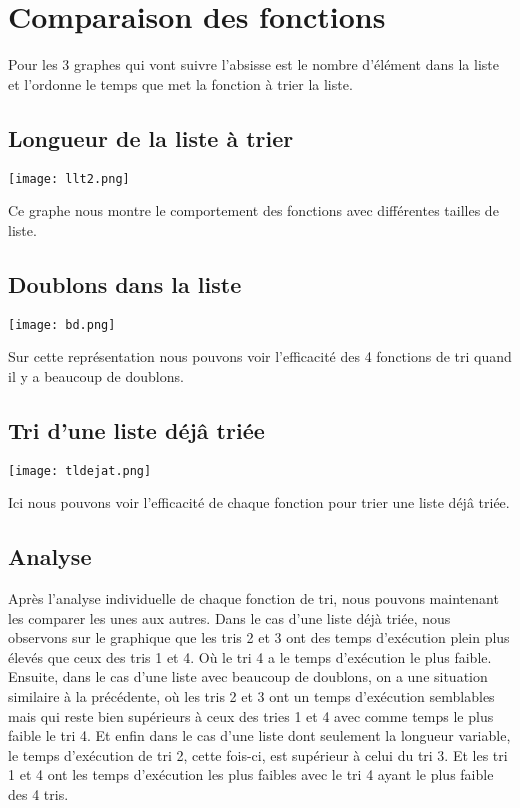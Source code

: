 \documentclass[a4paper, 12pt]{article}
\begin{document}
\section{Comparaison des fonctions}
Pour les 3 graphes qui vont suivre l'absisse est le nombre d'élément dans la liste et l'ordonne le temps que met la fonction à trier la liste.
\subsection{Longueur de la liste à trier}

\begin{center}
  \texttt{[image: llt2.png]}
\end{center}

Ce graphe nous montre le comportement des fonctions avec différentes tailles de liste.

\subsection{Doublons dans la liste}

\begin{center}
  \texttt{[image: bd.png]}
\end{center}

Sur cette représentation nous pouvons voir l'efficacité des 4 fonctions de tri quand il y a beaucoup de doublons.

\subsection{Tri d'une liste déjâ triée}

\begin{center}
  \texttt{[image: tldejat.png]}
\end{center}

Ici nous pouvons voir l'efficacité de chaque fonction pour trier une liste déjâ triée.

\subsection{Analyse}

Après l’analyse individuelle de chaque fonction de tri, nous pouvons maintenant les comparer les unes aux autres. Dans le cas d’une liste déjà triée, nous observons sur le graphique que les tris 2 et 3 ont des temps d’exécution plein plus élevés que ceux des tris 1 et 4. Où le tri 4 a le temps d’exécution le plus faible. Ensuite, dans le cas d’une liste avec beaucoup de doublons, on a une situation similaire à la précédente, où les tris 2 et 3 ont un temps d’exécution semblables mais qui reste bien supérieurs à ceux des tries 1 et 4 avec comme temps le plus faible le tri 4. Et enfin dans le cas d’une liste dont seulement la longueur variable, le temps d’exécution de tri 2, cette fois-ci, est supérieur à celui du tri 3. Et les tri 1 et 4 ont les temps d’exécution les plus faibles avec le tri 4 ayant le plus faible des 4 tris.
\end{document}
